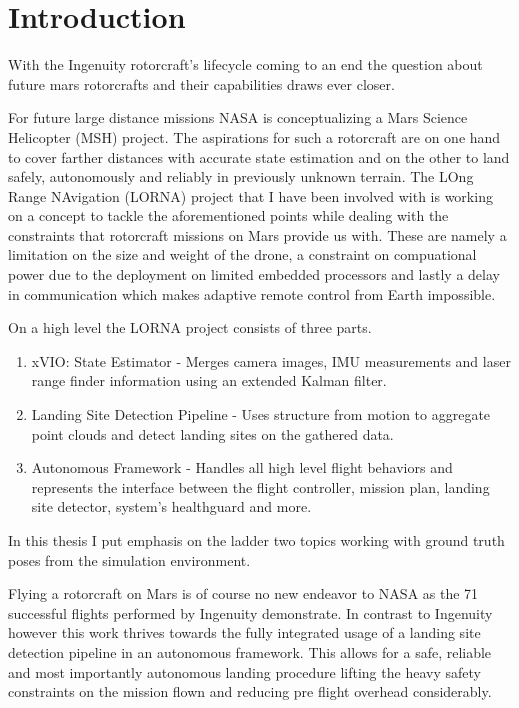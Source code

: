 \chapter{Introduction}
\label{sec:introduction}

With the Ingenuity rotorcraft's lifecycle coming to an end the question about future mars rotorcrafts and their capabilities draws ever closer. 

For future large distance missions NASA is conceptualizing a Mars Science Helicopter (MSH) project. The aspirations for such a rotorcraft are on one hand to cover farther distances with accurate state estimation and on the other to land safely, autonomously and reliably in previously unknown terrain. The LOng Range NAvigation (LORNA) project that I have been involved with is working on a concept to tackle the aforementioned points while dealing with the constraints that rotorcraft missions on Mars provide us with. These are namely a limitation on the size and weight of the drone, a constraint on compuational power due to the deployment on limited embedded processors and lastly a delay in communication which makes adaptive remote control from Earth impossible.

On a high level the LORNA project consists of three parts. 

\begin{enumerate}
    \item xVIO: State Estimator - Merges camera images, IMU measurements and laser range finder information using an extended Kalman filter.
    \item Landing Site Detection Pipeline - Uses structure from motion to aggregate point clouds and detect landing sites on the gathered data.
    \item Autonomous Framework - Handles all high level flight behaviors and represents the interface between the flight controller, mission plan, landing site detector, system's healthguard and more.
\end{enumerate}

In this thesis I put emphasis on the ladder two topics working with ground truth poses from the simulation environment.

Flying a rotorcraft on Mars is of course no new endeavor to NASA as the 71 successful flights performed by Ingenuity demonstrate. In contrast to Ingenuity however this work thrives towards the fully integrated usage of a landing site detection pipeline in an autonomous framework. This allows for a safe, reliable and most importantly autonomous landing procedure lifting the heavy safety constraints on the mission flown and reducing pre flight overhead considerably.

